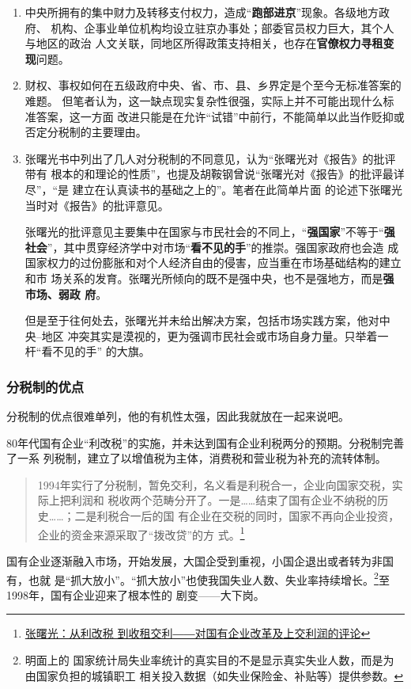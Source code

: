 \begin{enumerate}
\item 中央所拥有的集中财力及转移支付权力，造成“\textbf{跑部进京}”现象。各级地方政府、
  机构、企事业单位机构均设立驻京办事处；部委官员权力巨大，其个人与地区的政治
  人文关联，同地区所得政策支持相关，也存在\textbf{官僚权力寻租变现}问题。

\item 财权、事权如何在五级政府中央、省、市、县、乡界定是个至今无标准答案的难题。
  但笔者认为，这一缺点现实复杂性很强，实际上并不可能出现什么标准答案，这一方面
  改进只能是在允许“试错”中前行，不能简单以此当作贬抑或否定分税制的主要理由。

\item 张曙光书中列出了几人对分税制的不同意见，认为“张曙光对《报告》的批评带有
  根本的和理论的性质”，也提及胡鞍钢曾说“张曙光对《报告》的批评最详尽”，“是
  建立在认真读书的基础之上的”。笔者在此简单片面
  的论述下张曙光当时对《报告》的批评意见。

  张曙光的批评意见主要集中在国家与市民社会的不同上，“\textbf{强国家}”不等于“\textbf{强
    社会}”，其中贯穿经济学中对市场“\textbf{看不见的手}”的推崇。强国家政府也会造
  成国家权力的过份膨胀和对个人经济自由的侵害，应当重在市场基础结构的建立和市
  场关系的发育。张曙光所倾向的既不是强中央，也不是强地方，而是\textbf{强市场、弱政
    府}。

  但是至于往何处去，张曙光并未给出解决方案，包括市场实践方案，他对中央--地区
  冲突其实是漠视的，更为强调市民社会或市场自身力量。只举着一杆“看不见的手”
  的大旗。
\end{enumerate}


\subsubsection{分税制的优点}

分税制的优点很难单列，他的有机性太强，因此我就放在一起来说吧。

80年代国有企业“利改税”的实施，并未达到国有企业利税两分的预期。分税制完善了一系
列税制，建立了以增值税为主体，消费税和营业税为补充的流转体制。
\begin{quotation}
  1994年实行了分税制，暂免交利，名义看是利税合一，企业向国家交税，实际上把利润和
  税收两个范畴分开了。一是……结束了国有企业不纳税的历史……；二是利税合一后的国
  有企业在交税的同时，国家不再向企业投资，企业的资金来源采取了“拨改贷”的方
  式。\footnote{\href{http://www.aisixiang.com/data/28752.html}{张曙光：从利改税
      到收租交利――对国有企业改革及上交利润的评论}}
\end{quotation}
国有企业逐渐融入市场，开始发展，大国企受到重视，小国企退出或者转为非国有，也就
是“抓大放小”。“抓大放小”也使我国失业人数、失业率持续增长。\footnote{明面上的
  国家统计局失业率统计的真实目的不是显示真实失业人数，而是为由国家负担的城镇职工
  相关投入数据（如失业保险金、补贴等）提供参数。}至1998年，国有企业迎来了根本性的
剧变——大下岗。

